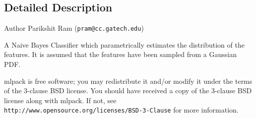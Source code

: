 \subsection{Detailed Description}
\begin{DoxyAuthor}{Author}
Parikshit Ram ({\tt pram@cc.\+gatech.\+edu})
\end{DoxyAuthor}
A Naive Bayes Classifier which parametrically estimates the distribution of the features. It is assumed that the features have been sampled from a Gaussian P\+DF.

mlpack is free software; you may redistribute it and/or modify it under the terms of the 3-\/clause B\+SD license. You should have received a copy of the 3-\/clause B\+SD license along with mlpack. If not, see {\tt http\+://www.\+opensource.\+org/licenses/\+B\+S\+D-\/3-\/\+Clause} for more information. 